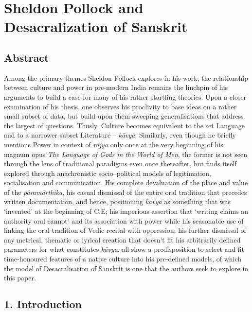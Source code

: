 
\chapter{Sheldon Pollock and Desacralization of Sanskrit}



\section*{Abstract}

Among the primary themes Sheldon Pollock explores in his work, the relationship between culture and power in pre-modern India remains the linchpin of his arguments to build a case for many of his rather startling theories. Upon a closer examination of his thesis, one observes his proclivity to base ideas on a rather small subset of data, but build upon them sweeping generalisations that address the largest of questions. Thusly, Culture becomes equivalent to the set Language and to a narrower subset Literature – \textit{kāvya}. Similarly, even though he briefly mentions Power in context of \textit{rājya} only once at the very beginning of his magnum opus \textit{The Language of Gods in the World of Men}, the former is not seen through the lens of traditional paradigms even once thereafter, but finds itself explored through anachronistic socio–political models of legitimation, socialisation and communication. His complete devaluation of the place and value of the \textit{pāramārthika}, his casual dismissal of the entire oral tradition that precedes written documentation, and hence, positioning \textit{kāvya} as something that was ‘invented’ at the beginning of C.E; his imperious assertion that ‘writing claims an authority oral cannot’ and its association with power while his seasonable use of linking the oral tradition of Vedic recital with oppression; his further dismissal of any metrical, thematic or lyrical creation that doesn’t fit his arbitrarily defined parameters for what constitutes \textit{kāvya}, all show a predisposition to select and fit time-honoured features of a native culture into his pre-defined models, of which the model of Desacralisation of Sanskrit is one that the authors seek to explore in this paper.


\section*{1. Introduction}

